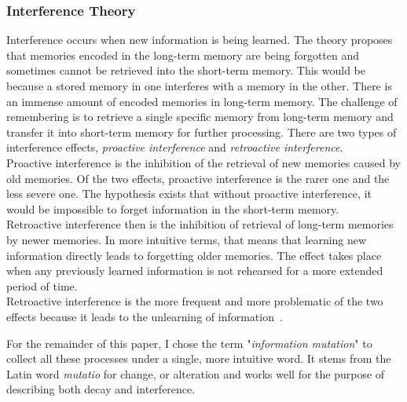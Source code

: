 \subsubsection{Interference Theory}
Interference occurs when new information is being learned. The theory proposes that memories encoded in the long-term memory are being forgotten and sometimes cannot be retrieved into the short-term memory. This would be because a stored memory in one interferes with a memory in the other. There is an immense amount of encoded memories in long-term memory. The challenge of remembering is to retrieve a single specific memory from long-term memory and transfer it into short-term memory for further processing. There are two types of interference effects, \textit{proactive interference} and \textit{retroactive interference}.~\cite{Edwards2010}\\
Proactive interference is the inhibition of the retrieval of new memories caused by old memories. Of the two effects, proactive interference is the rarer one and the less severe one. The hypothesis exists that without proactive interference, it would be impossible to forget information in the short-term memory.~\cite{Keppel1962}\\
Retroactive interference then is the inhibition of retrieval of long-term memories by newer memories. In more intuitive terms, that means that learning new information directly leads to forgetting older memories. The effect takes place when any previously learned information is not rehearsed for a more extended period of time.~\cite{Edwards2010}\\
Retroactive interference is the more frequent and more problematic of the two effects because it leads to the unlearning of information~\cite{Melton1941}.\newline

For the remainder of this paper, I chose the term "\textit{information mutation}" to collect all these processes under a single, more intuitive word. It stems from the Latin word \textit{mutatio} for change, or alteration and works well for the purpose of describing both decay and interference. 
